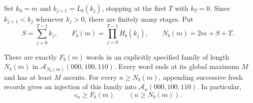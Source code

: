 \documentclass[11pt,letterpaper]{article}
\theoremstyle{remark}\newtheorem{remark}[theorem]{Remark}
\newcommand{\A}{\mathcal A}
\theoremstyle{remark}\newtheorem{wremark}{Remark}\renewcommand{\thewremark}{W\arabic{wremark}}
\theoremstyle{plain}\newtheorem{wcorollary}[wremark]{Corollary}
\begin{document}
Set $k_0=m$ and $k_{j+1}=L_b(k_j)$, stopping at the first $T$ with $k_T=0$. Since $k_{j+1}<k_j$ whenever $k_j>0$, there are finitely many stages. Put
\begin{equation}\label{a59:g:eq:FN}
 S=\sum_{j=0}^{T-1}k_j,\qquad
 F_b(m)=\prod_{j=0}^{T-1}H_b(k_j),\qquad
 N_b(m)=2m+S+T.
\end{equation}

\begin{proposition}\label{a59:g:prop:family}
There are exactly $F_b(m)$ words in an explicitly specified family of length $N_b(m)$ in $\A_{N_b(m)}(000,100,110)$. Every word ends at its global maximum $M$ and has at least $M$ ascents. For every $n\geq N_b(m)$, appending successive fresh records gives an injection of this family into $\A_n(000,100,110)$. In particular,
\begin{equation}\label{a59:g:eq:finite-lower}
 c_n\geq F_b(m)\qquad(n\geq N_b(m)).
\end{equation}
\end{proposition}
\end{document}

